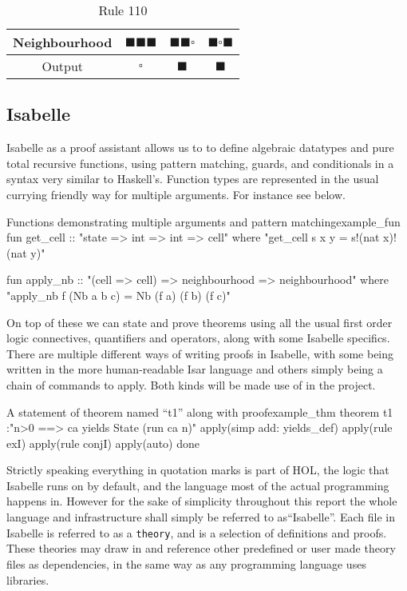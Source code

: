\begin{table}[htbp]
    \centering
    \begin{tabular}{c|ccc}
        Neighbourhood & $\blacksquare \blacksquare \blacksquare$ & $\blacksquare \blacksquare \square$ & $\blacksquare \square \blacksquare$  \\
         \hline
         Output & $\square$ & $\blacksquare$ & $\blacksquare$
    \end{tabular}
    \caption{Rule 110}
    \label{table:rule110}
\end{table}


\subsection{Isabelle}

Isabelle as a proof assistant allows us to to define algebraic datatypes and pure total recursive functions,
using pattern matching, guards, and conditionals in a syntax very similar to Haskell's.
Function types are represented in the usual currying friendly way for multiple arguments.
For instance see  below.

\begin{myminted}{Functions demonstrating multiple arguments and pattern matching}{example_fun}
    fun get_cell :: "state => int => int => cell" where
    "get_cell s x y = s!(nat x)!(nat y)"

    fun apply_nb :: "(cell => cell) => neighbourhood => neighbourhood" where
    "apply_nb f (Nb a b c) = Nb (f a) (f b) (f c)"
\end{myminted}

On top of these we can state and prove theorems using all the usual first order logic connectives, quantifiers and operators,
along with some Isabelle specifics.
There are multiple different ways of writing proofs in Isabelle,
with some being written in the more human-readable Isar language
and others simply being a chain of commands to apply.
Both kinds will be made use of in the project.

\begin{myminted}{A statement of theorem named ``t1'' along with proof}{example_thm}
    theorem t1 :"n>0 ==> ca yields State (run ca n)"
      apply(simp add: yields_def)
      apply(rule exI)
      apply(rule conjI)
      apply(auto)
      done
\end{myminted}

Strictly speaking everything in quotation marks is part of HOL,
the logic that Isabelle runs on by default,
and the language most of the actual programming happens in.
However for the sake of simplicity throughout this report the whole language and infrastructure shall simply be referred to as``Isabelle''.
Each file in Isabelle is referred to as a \texttt{theory},
and is a selection of definitions and proofs.
These theories may draw in and reference other predefined or user made theory files as dependencies, in the same way as any programming language uses libraries.

